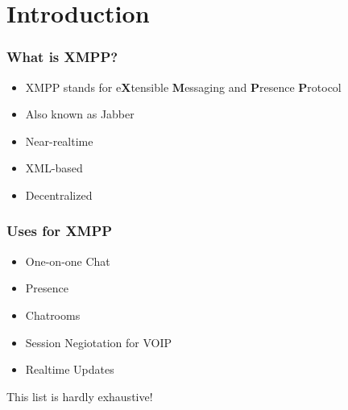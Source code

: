 \part{Introduction}

\newpage
\section*{What is XMPP?}
\pause

\begin{itemize}
\item XMPP stands for e\textbf{X}tensible \textbf{M}essaging and \textbf{P}resence \textbf{P}rotocol
\pause
\item Also known as Jabber
\pause
\item Near-realtime
\pause
\item XML-based
\pause
\item Decentralized
\end{itemize}

\newpage
\section*{Uses for XMPP}
\pause

\begin{itemize}
\item One-on-one Chat
\pause
\item Presence
\pause
\item Chatrooms
\pause
\item Session Negiotation for VOIP
\pause
\item Realtime Updates
\end{itemize}

\pause
\vfill
\begin{center}
This list is hardly exhaustive!
\end{center}
